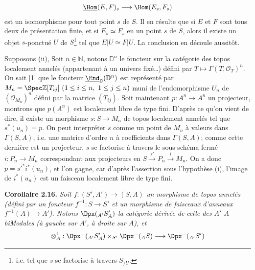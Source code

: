 \[
  \underline{\Hom}(E,F)_s\longrightarrow\Hom(E_s,F_s)
\]
est un
isomorphisme pour tout point \(s\) de \(S\). Il en résulte que si \(E\) et \(F\) sont tous deux de présentation finie, et si \(E_s\simeq F_s\) en un point \(s\) de \(S\), alors il existe un objet \(s\)-ponctué \(U\) de \(S\)\footnote{i.e. tel que \(s\) se factorise à travers \(S_{/U}\).} tel que \(E|U\simeq F|U\). La conclusion en découle aussitôt.

Supposons (ii), Soit \(n\in\mathbb N\), notons \(\mathbb D^n\) le foncteur sur la catégorie des topos localement annelés (appartenant à un univers fixé\dots) défini par \(T\longmapsto\Gamma(T,\mathcal O_T)^n\). On sait [1] que le foncteur \(\underline{\End}_{\mathbb D}(\mathbb D^n)\) est représenté par \(M_n=\Spec\mathbb Z[T_{ij}]\ (1\leq i\leq n,\ 1\leq j\leq n)\) muni de l'endomorphisme \(U_n\) de \((\mathcal O_{M_n})^n\) défini par la matrice \((T_{ij})\). Soit maintenant \(p:A^n\longrightarrow A^n\) un projecteur, montrons que \(p(A^n)\) est localement libre de type fini. D'après ce qu'on vient de dire, il existe un morphisme \(s:S\longrightarrow M_n\) de topos localement annelés tel que \(s^*(u_n)=p\). On peut interpréter \(s\) comme un point de \(M_n\) à valeurs dans \(\Gamma(S,A)\), i.e. une matrice d'ordre \(n\) à coefficients dans \(\Gamma(S,A)\); comme cette dernière est un projecteur, \(s\) se factorise à travers le sous-schéma fermé \(i:P_n\to M_n\) correspondant aux projecteurs en \(S\xrightarrow{s'}P_n\xrightarrow{i}M_n\). On a donc \(p=s'^*i^*(u_n)\), et l'on gagne, car d'après l'assertion sous l'hypothèse (i), l'image de \(i^*(u_n)\) est un faisceau localement libre de type fini.

\textbf{Corollaire 2.16.} \emph{Soit \(f:(S',A')\to(S,A)\) un morphisme de topos annelés (défini par un foncteur \(f^{-1}:S\to S'\) et un morphisme de faisceaux d'anneaux \(f^{-1}(A)\to A'\)). Notons \(\Dpx({}_{A'}S'_A)\) la catégorie dérivée de celle des \(A'\)-\(A\)-biModules (à gauche sur \(A'\), à droite sur \(A\)), et}
\[
  \otimes_A^{\mathrm L}:\Dpx^-(_{A'}S'_A)\times_{S'}\Dpx^-(_A S)
  \longrightarrow \Dpx^-(_{A'}S')
\]
